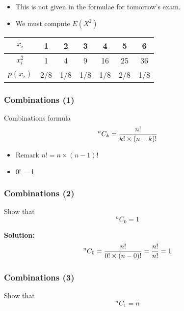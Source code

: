 \begin{itemize}
{\begin{itemize}
		\[ V(X) = E(X^2) - E(X)^2 \]
		
		\item This is not given in the formulae for tomorrow's exam.
		
		\item We must compute $E(X^2)$
	\end{itemize}
	
	\begin{center}
		\begin{tabular}{|c||c|c|c|c|c|c|}
			\hline
			$x_i$  & 1 & 2 & 3 & 4 & 5 & 6 \\\hline
			$x^2_i$  & 1 & 4 & 9 & 16 & 25 & 36 \\\hline
			$p(x_i)$ & 2/8 & 1/8& 1/8 & 1/8& 2/8 & 1/8\\
			\hline
		\end{tabular}
	\end{center}
}

\begin{frame}
	\frametitle{Combinations (1)}
	Combinations formula
	\[ ^{n}C_k  = {n! \over k!  \times (n-k)!} \]
	
	\begin{itemize}
		\item Remark $n! = n \times (n-1)! $
		\item 0! = 1
	\end{itemize}
\end{frame}
\begin{frame}
	\frametitle{Combinations (2)}
	Show that
	\[ ^{n}C_0  = 1 \]
	
	\textbf{Solution: }
	\[ ^{n}C_0  = {n! \over 0!  \times (n-0)!} =  {n! \over n!} = 1 \]
	
\end{frame}
\begin{frame}
	\frametitle{Combinations (3)}
	Show that
	\[ ^{n}C_1  = n \]
	

\end{frame}
\end{itemize}
